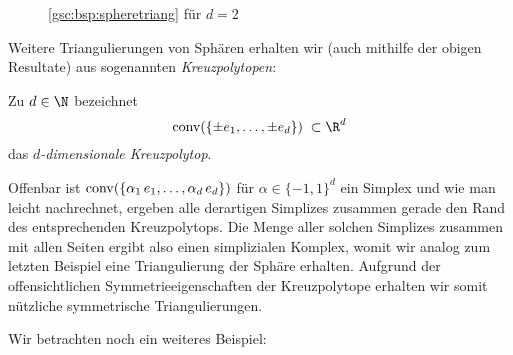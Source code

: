 \begin{figure}
    \centering
    \caption{\cref{gsc:bsp:spheretriang} für $d=2$}
    \label{gsc:fig:spheretriang}
\end{figure}

Weitere Triangulierungen von Sphären erhalten wir (auch mithilfe der obigen
Resultate) aus sogenannten \emph{Kreuzpolytopen}:

\begin{thDef}[Kreuzpolytop]
    Zu $d\in\N$ bezeichnet
    \[ \conv(\{ \pm e_1, \ldots, \pm e_d \}) \;\subset\R^d \]
    das \emph{$d$-dimensionale Kreuzpolytop}.
\end{thDef}


Offenbar ist $\operatorname{conv}(\{\alpha_1\,e_1,\ldots,\alpha_d\,e_d\})$ für
$\alpha\in\{-1,1\}^d$ ein Simplex und wie man leicht nachrechnet, ergeben alle
derartigen Simplizes zusammen gerade den Rand des entsprechenden Kreuzpolytops. 
Die Menge aller solchen Simplizes zusammen mit allen Seiten ergibt also einen
simplizialen Komplex, womit wir analog zum letzten Beispiel eine Triangulierung
der Sphäre erhalten. Aufgrund der offensichtlichen Symmetrieeigenschaften der
Kreuzpolytope erhalten wir somit nützliche symmetrische Triangulierungen. 

Wir betrachten noch ein weiteres Beispiel:

